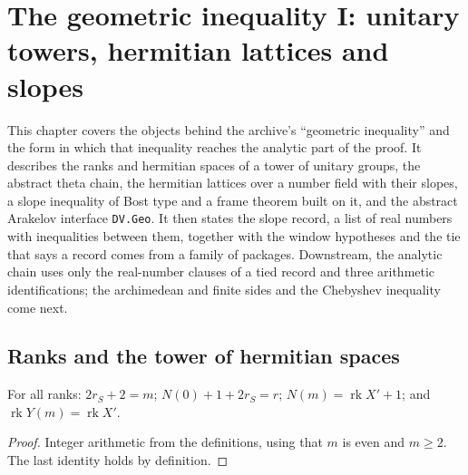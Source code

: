 \chapter{The geometric inequality I: unitary towers, hermitian lattices and slopes}\label{ch:geoa}

This chapter covers the objects behind the archive's ``geometric inequality'' and the
form in which that inequality reaches the analytic part of the proof. It describes the
ranks and hermitian spaces of a tower of unitary groups, the abstract theta chain, the
hermitian lattices over a number field with their slopes, a slope inequality of Bost
type and a frame theorem built on it, and the abstract Arakelov interface \texttt{DV.Geo}.
It then states the slope record, a list of real numbers with inequalities between them,
together with the window hypotheses and the tie that says a record comes from a family
of packages. Downstream, the analytic chain uses only the real-number clauses of a tied
record and three arithmetic identifications; the archimedean and finite sides and the Chebyshev inequality come next.

\section{Ranks and the tower of hermitian spaces}



\begin{lemma}\label{geoa:rank-identities}
For all ranks: $2r_S+2=m$; $N(0)+1+2r_S=r$; $N(m)=\operatorname{rk}X'+1$; and
$\operatorname{rk}Y(m)=\operatorname{rk}X'$.
\end{lemma}
\begin{proof}
Integer arithmetic from the definitions, using that $m$ is even and $m\ge2$. The last
identity holds by definition.
\end{proof}

